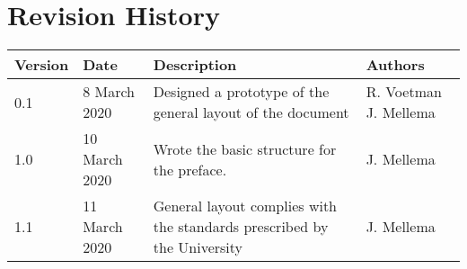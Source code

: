 \chapter*{Revision History}
\begin{center}
    \begin{tabularx}{\textwidth}{ | l | l | X | l | }
        \hline
        \textbf{Version}  & \textbf{Date}  & \textbf{Description}                                                    & \textbf{Authors} \\\hline
        0.1               & 8 March 2020   & Designed a prototype of the general layout of the document              & R. Voetman J. Mellema \\\hline
        1.0               & 10 March 2020  & Wrote the basic structure for the preface.                              & J. Mellema \\\hline
        1.1               & 11 March 2020  & General layout complies with the standards prescribed by the University & J. Mellema \\\hline
    \end{tabularx}
\end{center}